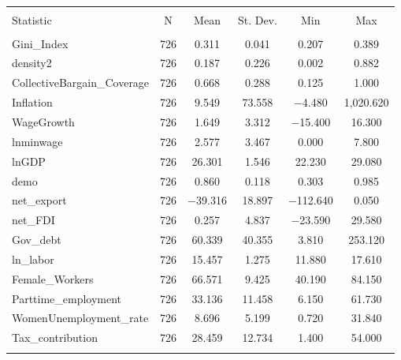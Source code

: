 
\begin{table}[!htbp] \centering 
  \caption{} 
  \label{} 
\begin{tabular}{@{\extracolsep{5pt}}lccccc} 
\\[-1.8ex]\hline 
\hline \\[-1.8ex] 
Statistic & \multicolumn{1}{c}{N} & \multicolumn{1}{c}{Mean} & \multicolumn{1}{c}{St. Dev.} & \multicolumn{1}{c}{Min} & \multicolumn{1}{c}{Max} \\ 
\hline \\[-1.8ex] 
Gini\_Index & 726 & 0.311 & 0.041 & 0.207 & 0.389 \\ 
density2 & 726 & 0.187 & 0.226 & 0.002 & 0.882 \\ 
CollectiveBargain\_Coverage & 726 & 0.668 & 0.288 & 0.125 & 1.000 \\ 
Inflation & 726 & 9.549 & 73.558 & $-$4.480 & 1,020.620 \\ 
WageGrowth & 726 & 1.649 & 3.312 & $-$15.400 & 16.300 \\ 
lnminwage & 726 & 2.577 & 3.467 & 0.000 & 7.800 \\ 
lnGDP & 726 & 26.301 & 1.546 & 22.230 & 29.080 \\ 
demo & 726 & 0.860 & 0.118 & 0.303 & 0.985 \\ 
net\_export & 726 & $-$39.316 & 18.897 & $-$112.640 & 0.050 \\ 
net\_FDI & 726 & 0.257 & 4.837 & $-$23.590 & 29.580 \\ 
Gov\_debt & 726 & 60.339 & 40.355 & 3.810 & 253.120 \\ 
ln\_labor & 726 & 15.457 & 1.275 & 11.880 & 17.610 \\ 
Female\_Workers & 726 & 66.571 & 9.425 & 40.190 & 84.150 \\ 
Parttime\_employment & 726 & 33.136 & 11.458 & 6.150 & 61.730 \\ 
WomenUnemployment\_rate & 726 & 8.696 & 5.199 & 0.720 & 31.840 \\ 
Tax\_contribution & 726 & 28.459 & 12.734 & 1.400 & 54.000 \\ 
\hline \\[-1.8ex] 
\end{tabular} 
\end{table} 
